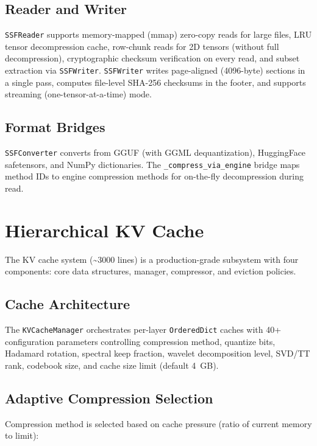 \documentclass[11pt,a4paper,twocolumn]{article}
\begin{document}
\subsection{Reader and Writer}
\texttt{SSFReader} supports memory-mapped (mmap) zero-copy reads for large files, LRU tensor decompression cache, row-chunk reads for 2D tensors (without full decompression), cryptographic checksum verification on every read, and subset extraction via \texttt{SSFWriter}. \texttt{SSFWriter} writes page-aligned (4096-byte) sections in a single pass, computes file-level SHA-256 checksums in the footer, and supports streaming (one-tensor-at-a-time) mode.

\subsection{Format Bridges}
\texttt{SSFConverter} converts from GGUF (with GGML dequantization), HuggingFace safetensors, and NumPy dictionaries. The \texttt{\_compress\_via\_engine} bridge maps method IDs to engine compression methods for on-the-fly decompression during read.

\section{Hierarchical KV Cache}
\label{sec:kvcache}

The KV cache system (\textasciitilde3000 lines) is a production-grade subsystem with four components: core data structures, manager, compressor, and eviction policies.

\subsection{Cache Architecture}
The \texttt{KVCacheManager} orchestrates per-layer \texttt{OrderedDict} caches with 40+ configuration parameters controlling compression method, quantize bits, Hadamard rotation, spectral keep fraction, wavelet decomposition level, SVD/TT rank, codebook size, and cache size limit (default 4~GB).

\subsection{Adaptive Compression Selection}
Compression method is selected based on cache pressure (ratio of current memory to limit):
\end{document}
